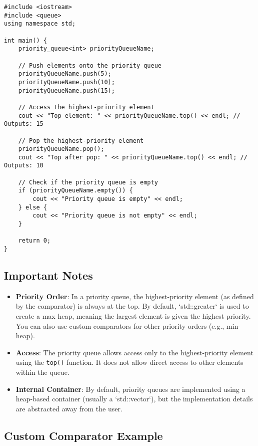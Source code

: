 \documentclass{article}
\begin{document}
\begin{lstlisting}
#include <iostream>
#include <queue>
using namespace std;

int main() {
    priority_queue<int> priorityQueueName;
    
    // Push elements onto the priority queue
    priorityQueueName.push(5);
    priorityQueueName.push(10);
    priorityQueueName.push(15);
    
    // Access the highest-priority element
    cout << "Top element: " << priorityQueueName.top() << endl; // Outputs: 15
    
    // Pop the highest-priority element
    priorityQueueName.pop();
    cout << "Top after pop: " << priorityQueueName.top() << endl; // Outputs: 10
    
    // Check if the priority queue is empty
    if (priorityQueueName.empty()) {
        cout << "Priority queue is empty" << endl;
    } else {
        cout << "Priority queue is not empty" << endl;
    }
    
    return 0;
}
\end{lstlisting}

\subsection{Important Notes}

\begin{itemize}
    \item \textbf{Priority Order}: In a priority queue, the highest-priority element (as defined by the comparator) is always at the top. By default, `std::greater` is used to create a max heap, meaning the largest element is given the highest priority. You can also use custom comparators for other priority orders (e.g., min-heap).
    \item \textbf{Access}: The priority queue allows access only to the highest-priority element using the \texttt{top()} function. It does not allow direct access to other elements within the queue.
    \item \textbf{Internal Container}: By default, priority queues are implemented using a heap-based container (usually a `std::vector`), but the implementation details are abstracted away from the user.
\end{itemize}

\subsection{Custom Comparator Example}
\end{document}
